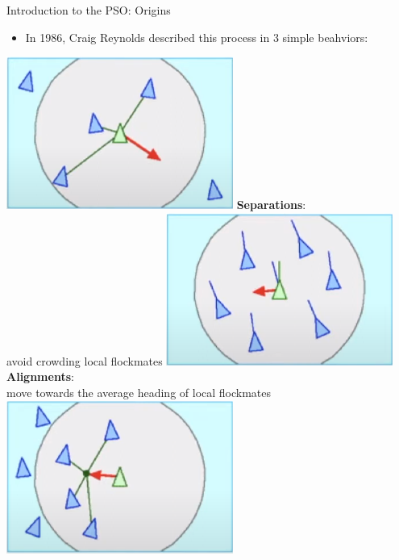 \documentclass[pdflatex,compress,mathserif]{beamer}
\begin{document}
\begin{frame}{Introduction to the PSO: Origins}
	\begin{itemize}
		\item In 1986, Craig Reynolds described this process in 3 simple beahviors:
	\end{itemize}
	\begin{multicols}{3}
		\includegraphics[width=\linewidth]{img/04}
		\scriptsize{\textbf{Separations}:\\
			avoid crowding local flockmates}
		\vfill\null
		\columnbreak
		\includegraphics[width=\linewidth]{img/05}
		\scriptsize{\textbf{Alignments}:\\
			move towards the average heading of local flockmates}
		\vfill\null
		\columnbreak
		\includegraphics[width=\linewidth]{img/06}

\end{multicols}
\end{frame}
\end{document}
